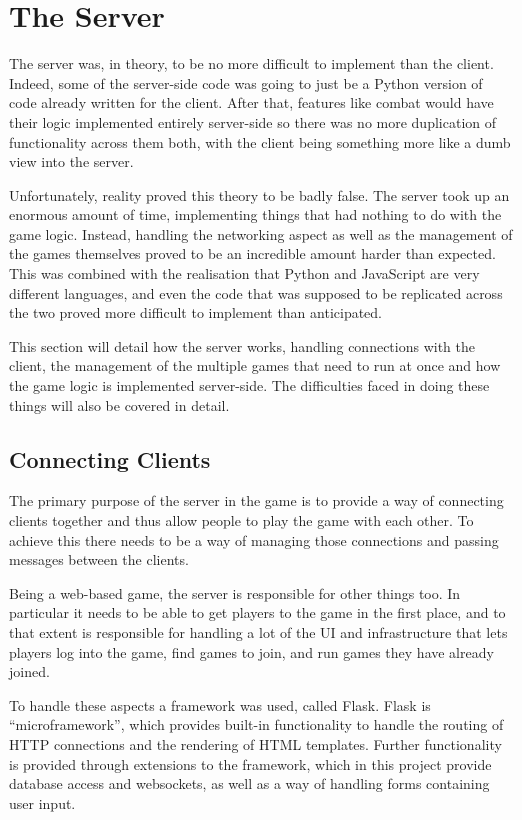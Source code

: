 \section{The Server}\label{server_implementation}
The server was, in theory, to be no more difficult to implement than the client. Indeed, some of the server-side code was going to just be a Python version of code already written for the client. After that, features like combat would have their logic implemented entirely server-side so there was no more duplication of functionality across them both, with the client being something more like a dumb view into the server.

Unfortunately, reality proved this theory to be badly false. The server took up an enormous amount of time, implementing things that had nothing to do with the game logic. Instead, handling the networking aspect as well as the management of the games themselves proved to be an incredible amount harder than expected. This was combined with the realisation that Python and JavaScript are very different languages, and even the code that was supposed to be replicated across the two proved more difficult to implement than anticipated.

This section will detail how the server works, handling connections with the client, the management of the multiple games that need to run at once and how the game logic is implemented server-side. The difficulties faced in doing these things will also be covered in detail.

\subsection{Connecting Clients}
The primary purpose of the server in the game is to provide a way of connecting clients together and thus allow people to play the game with each other. To achieve this there needs to be a way of managing those connections and passing messages between the clients.

Being a web-based game, the server is responsible for other things too. In particular it needs to be able to get players to the game in the first place, and to that extent is responsible for handling a lot of the UI and infrastructure that lets players log into the game, find games to join, and run games they have already joined.

To handle these aspects a framework was used, called Flask. Flask is ``microframework'', which provides built-in functionality to handle the routing of HTTP connections and the rendering of HTML templates. Further functionality is provided through extensions to the framework, which in this project provide database access and websockets, as well as a way of handling forms containing user input.

